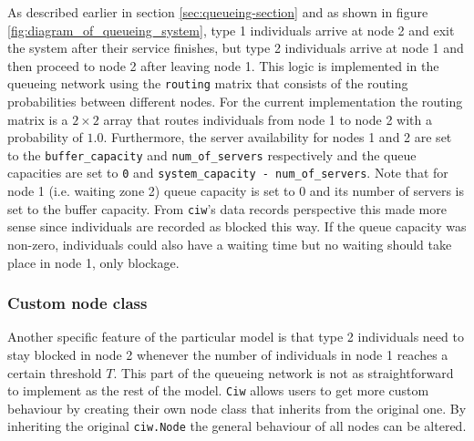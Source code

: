 As described earlier in section \ref{sec:queueing-section} and as shown in
figure \ref{fig:diagram_of_queueing_system}, type 1 individuals arrive at node 2
and exit the system after their service finishes, but type 2 individuals arrive
at node 1 and then proceed to node 2 after leaving node 1.
This logic is implemented in the queueing network using the
\lstinline[style=pystyle]{routing} matrix that consists of the routing
probabilities between different nodes.
For the current implementation the routing matrix is a \(2 \times 2\) array
that routes individuals from node 1 to node 2 with a probability of \(1.0\).
Furthermore, the server availability for nodes 1 and 2 are set to
the \lstinline[style=pystyle]{buffer_capacity} and
\lstinline[style=pystyle]{num_of_servers} respectively and the queue capacities
are set to \lstinline[style=pystyle]{0} and
\lstinline[style=pystyle]{system_capacity - num_of_servers}.
Note that for node 1 (i.e. waiting zone 2) queue capacity is set to 0 and its
number of servers is set to the buffer capacity.
From \lstinline[style=pystyle]{ciw}'s data records perspective this made more
sense since individuals are recorded as blocked this way.
If the queue capacity was non-zero, individuals could also have a waiting time
but no waiting should take place in node 1, only blockage.


\subsubsection{Custom node class}
Another specific feature of the particular model is that type 2 individuals
need to stay blocked in node 2 whenever the number of individuals in node 1
reaches a certain threshold \(T\).
This part of the queueing network is not as straightforward to implement as the
rest of the model.
\lstinline[style=pystyle]{Ciw} allows users to get more custom behaviour by
creating their own node class that inherits from the original one.
By inheriting the original \lstinline[style=pystyle]{ciw.Node} the general
behaviour of all nodes can be altered.


